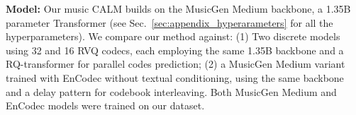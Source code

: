\begin{table}
\caption{\textbf{Ablation study on music CALM Consistency 4-steps model components, after 250K training steps.} Removing noise augmentation or the short-context transformer leads to significant performance drops. Final row approximates the MAR configuration from \citet{autoreg_image_quant}.}

\centering
\small
\renewcommand{\arraystretch}{1.1}
\begin{sc}
\end{sc}
\label{tab:ablation_fad}
\end{table}


\noindent\textbf{Model:} Our music CALM builds on the MusicGen Medium backbone, a 1.35B parameter Transformer (see Sec.~\ref{sec:appendix_hyperarameters} for all the hyperparameters).  
We compare our method against: (1) Two discrete models using 32 and 16 RVQ codecs, each employing the same 1.35B backbone and a RQ-transformer for parallel codes prediction; (2) a MusicGen Medium variant trained with EnCodec without textual conditioning, using the same backbone and a delay pattern for codebook interleaving. Both MusicGen Medium and EnCodec models were trained on our dataset.

